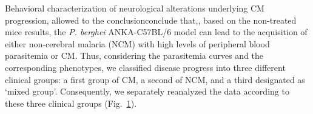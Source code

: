 \documentclass[empirical, authordate]{jote-new-article}
\begin{document}
\begin{figure}[h!]
  \begin{fullwidth}
    \raggedright
    \caption{}
    \label{fig:3}
  \end{fullwidth}
\end{figure}
Behavioral characterization of neurological alterations underlying CM progression, allowed to the conclusionconclude that,, based on the non-treated mice results, the \emph{P. berghei} ANKA-C57BL/6 model can lead to the acquisition of either non-cerebral malaria (NCM) with high levels of peripheral blood parasitemia or CM. Thus, considering the parasitemia curves and the corresponding phenotypes, we classified disease progress into three different clinical groups: a first group of CM, a second of NCM, and a third designated as `mixed group'. Consequently, we separately reanalyzed the data according to these three clinical groups (Fig.~\ref{fig:3}).
\end{document}
